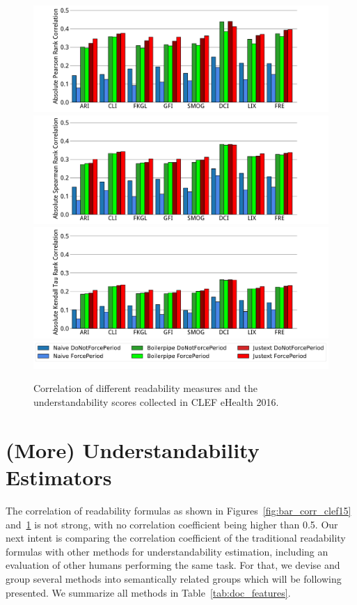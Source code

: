 \documentclass[runningheads,a4paper]{llncs}
\begin{document}
\begin{figure}[th!]
   \centering
    \includegraphics[width=1.\textwidth]{graphics/bar_corr_pearson16_values}
    \includegraphics[width=1.\textwidth]{graphics/bar_corr_spearman16_values}
    \includegraphics[width=1.\textwidth]{graphics/bar_corr_kendalltau16_values}
    \includegraphics[width=1\textwidth]{graphics/legend62}
    \caption{Correlation of different readability measures and the understandability scores collected in CLEF eHealth 2016.}
   \label{fig:bar_corr_clef16}
\end{figure}


\section{(More) Understandability Estimators}
\label{sec:proxies}

The correlation of readability formulas as shown in Figures~\ref{fig:bar_corr_clef15} and~\ref{fig:bar_corr_clef16} is not strong, with no correlation coefficient being higher than 0.5.
Our next intent is comparing the correlation coefficient of the traditional readability formulas with other methods for understandability estimation, including an evaluation of other humans performing the same task.
For that, we devise and group several methods into semantically related groups which will be following presented.
We summarize all methods in Table~\ref{tab:doc_features}.
\end{document}
